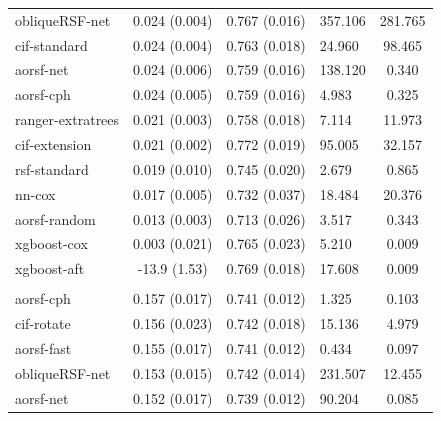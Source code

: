 \documentclass[twoside,11pt]{article}\usepackage[]{graphicx}\usepackage[]{xcolor}
\newenvironment{knitrout}{}{} %
\begin{document}
\begin{knitrout}
\begin{longtable}[t]{lcclc}
\hspace{1em}obliqueRSF-net & 0.024 (0.004) & 0.767 (0.016) & 357.106 & 281.765\\
\hspace{1em}cif-standard & 0.024 (0.004) & 0.763 (0.018) & 24.960 & 98.465\\
\hspace{1em}aorsf-net & 0.024 (0.006) & 0.759 (0.016) & 138.120 & 0.340\\
\hspace{1em}aorsf-cph & 0.024 (0.005) & 0.759 (0.016) & 4.983 & 0.325\\
\hspace{1em}ranger-extratrees & 0.021 (0.003) & 0.758 (0.018) & 7.114 & 11.973\\
\hspace{1em}cif-extension & 0.021 (0.002) & 0.772 (0.019) & 95.005 & 32.157\\
\hspace{1em}rsf-standard & 0.019 (0.010) & 0.745 (0.020) & 2.679 & 0.865\\
\hspace{1em}nn-cox & 0.017 (0.005) & 0.732 (0.037) & 18.484 & 20.376\\
\hspace{1em}aorsf-random & 0.013 (0.003) & 0.713 (0.026) & 3.517 & 0.343\\
\hspace{1em}xgboost-cox & 0.003 (0.021) & 0.765 (0.023) & 5.210 & 0.009\\
\hspace{1em}xgboost-aft & -13.9 (1.53) & 0.769 (0.018) & 17.608 & 0.009\\
\addlinespace[0.3em]
\hline
\multicolumn{5}{l}{\textit{\textbf{Monoclonal gammopathy; death, n = 1384, p = 8}}}\\
\hline
\hspace{1em}aorsf-cph & 0.157 (0.017) & 0.741 (0.012) & 1.325 & 0.103\\
\hspace{1em}cif-rotate & 0.156 (0.023) & 0.742 (0.018) & 15.136 & 4.979\\
\hspace{1em}aorsf-fast & 0.155 (0.017) & 0.741 (0.012) & 0.434 & 0.097\\
\hspace{1em}obliqueRSF-net & 0.153 (0.015) & 0.742 (0.014) & 231.507 & 12.455\\
\hspace{1em}aorsf-net & 0.152 (0.017) & 0.739 (0.012) & 90.204 & 0.085\\

\end{longtable}
\end{knitrout}
\end{document}

